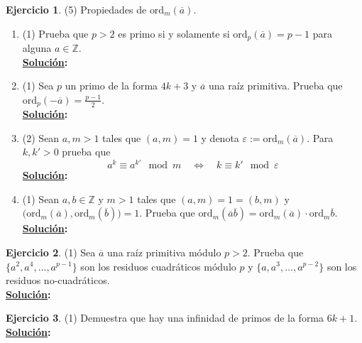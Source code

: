 \documentclass[11pt,letterpaper]{article}
\theoremstyle{definition}\newtheorem{p}{Ejercicio}
\newcommand{\Z}{\mathbb{Z}}
\newcommand{\sii}{\Longleftrightarrow}
\newcommand{\clase}[1]{\overline{#1}}  %
\newcommand{\ord}{\text{ord}}
\newcommand{\sol}{\textbf{\underline{Solución}: }} %
\begin{document}
\begin{p}(5)
Propiedades de $\ord_m(\clase{a})$.
\begin{enumerate}
  \item(1) Prueba que $p>2$ es primo si y solamente si $\ord_p(\clase{a})=p-1$ para alguna $a\in\Z$.\\
  \sol

  \item(1) Sea $p$ un primo de la forma $4k+3$ y $\clase{a}$ una ra\'iz primitiva. Prueba que
  $\ord_p(-\clase{a})=\frac{p-1}{2}$.\\
  \sol

  \item(2) Sean $a,m>1$ tales que $(a,m)=1$ y denota $\varepsilon:=\ord_m(\clase{a})$. Para $k,k'>0$
  prueba que
  \[
    a^k\equiv a^{k'}\mod m \quad\sii\quad k\equiv k'\mod \varepsilon
  \]
  \sol

  \item(1) Sean $a,b\in\Z$ y $m>1$ tales que $(a,m)=1=(b,m)$ y
  $\big(\ord_m(\clase{a}),\ord_m(\clase{b})\big)=1$. Prueba que
  $\ord_m(\clase{a}\clase{b})=\ord_m(\clase{a})\cdot\ord_m\clase{b}$.\\
  \sol 

\end{enumerate}
\end{p}


\begin{p}(1)
Sea $\clase{a}$ una ra\'iz primitiva m\'odulo $p>2$. Prueba que $\{a^2,a^4,\ldots,a^{p-1}\}$ son
los residuos cuadr\'aticos m\'odulo $p$ y $\{a,a^3,\ldots,a^{p-2}\}$ son los residuos
no-cuadr\'aticos.\\
\sol
\end{p}


\begin{p}(1)
Demuestra que hay una infinidad de primos de la forma $6k+1$.\\
\sol

\end{p}
\end{document}
